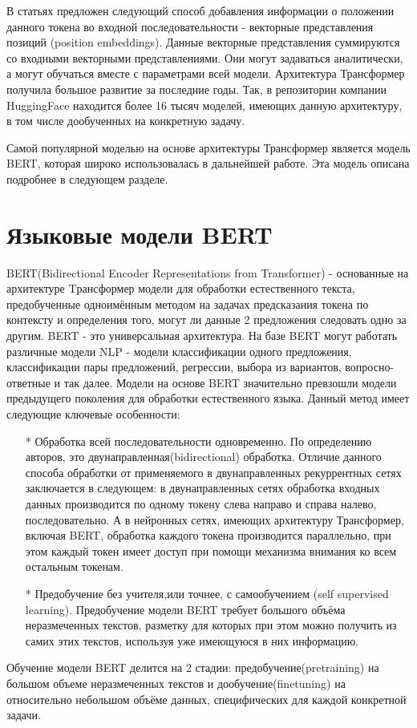 В статьях \cite{devlin_2018,gehring_2017,vaswani_2017} предложен следующий способ добавления информации о положении данного токена во входной последовательности - векторные представления позиций (position embeddings). Данные векторные представления суммируются со входными векторными представлениями. Они могут задаваться аналитически, а могут обучаться вместе с параметрами всей модели.
Архитектура Трансформер получила большое развитие за последние годы. Так, в репозитории компании HuggingFace \cite{na_website_ndaa} находится более 16 тысяч моделей, имеющих данную архитектуру, в том числе дообученных на конкретную задачу. 

Самой популярной моделью на основе архитектуры Трансформер является модель BERT, которая широко использовалась в дальнейшей работе. Эта модель описана подробнее в следующем разделе. 

\section{Языковые модели BERT}

BERT(Bidirectional Encoder Representations from Transformer) \cite{devlin_2018} - основанные на архитектуре Tрансформер модели для обработки естественного текста, предобученные одноимённым методом на задачах предсказания токена по контексту и определения того, могут ли данные 2 предложения следовать одно за другим. BERT - это универсальная архитектура. На базе BERT могут работать различные модели NLP - модели классификации одного предложения, классификации пары предложений, регрессии, выбора из вариантов, вопросно-ответные и так далее. Модели на основе BERT значительно превзошли модели предыдущего поколения для обработки естественного языка. 
Данный метод имеет следующие ключевые особенности:
\begin{itemize}
\item[*] Обработка всей последовательности одновременно. По определению авторов, это двунаправленная(bidirectional) обработка. Отличие данного способа обработки от применяемого в двунаправленных рекуррентных сетях заключается в следующем: в двунаправленных сетях обработка входных данных производится по одному токену слева направо и справа налево, последовательно. А в нейронных сетях, имеющих архитектуру Трансформер, включая BERT, обработка каждого токена производится параллельно, при этом каждый токен имеет доступ при помощи механизма внимания ко всем остальным токенам. 
\item[*] Предобучение без учителя,или точнее, с самообучением (self supervised learning). Предобучение модели BERT требует большого объёма неразмеченных текстов, разметку для которых при этом можно получить из самих этих текстов, используя уже имеющуюся в них информацию.
\end{itemize}
Обучение модели BERT делится на 2 стадии: предобучение(pretraining) на большом объеме неразмеченных текстов и дообучение(finetuning) на относительно небольшом объёме данных, специфических для каждой конкретной задачи. 

